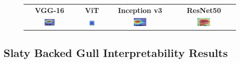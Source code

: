 \documentclass[a4paper,12pt]{report}
\begin{document}
\begin{figure}[H]
    \centering
    \setlength{\tabcolsep}{1pt}
    \begin{tabular}{cccc}
    \textbf{VGG-16} & \textbf{ViT} & \textbf{Inception v3} & \textbf{ResNet50} \\
    
    \includegraphics[width=0.22\textwidth]{images/appendix/modelgraph/vgg/correct/Glaucous_Winged_Gull/3O4A8774 - Version 2.JPG} &
    \includegraphics[width=0.22\textwidth]{images/appendix/modelgraph/vit/correct/Glaucous_Winged_Gull/3O4A8774 - Version 2.JPG} &
    \includegraphics[width=0.22\textwidth]{images/appendix/modelgraph/inception/correct/Glaucous_Winged_Gull/3O4A8774 - Version 2.JPG} &
    \includegraphics[width=0.22\textwidth]{images/appendix/modelgraph/resnet/correct/Glaucous_Winged_Gull/3O4A8774 - Version 2.JPG} \\
    \end{tabular}

    \label{fig:interpretability_glaucous_6}
\end{figure}

\clearpage
\subsection{Slaty Backed Gull Interpretability Results}
\label{subsec:slaty_interpretability}
\end{document}
